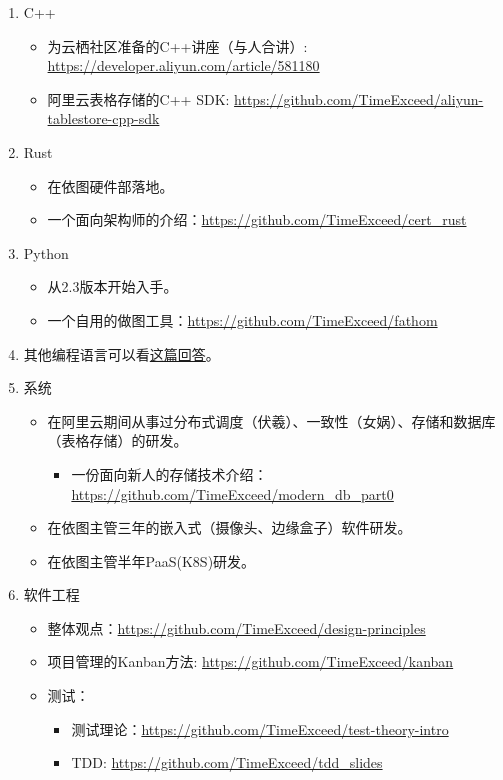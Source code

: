 \documentclass[scheme=plain]{ctexart}
\begin{document}
\begin{enumerate}
    \item C++
        \begin{itemize}
            \item 为云栖社区准备的C++讲座（与人合讲）: \url{https://developer.aliyun.com/article/581180}
            \item 阿里云表格存储的C++ SDK: \url{https://github.com/TimeExceed/aliyun-tablestore-cpp-sdk}
        \end{itemize}
    \item Rust
        \begin{itemize}
            \item 在依图硬件部落地。
            \item 一个面向架构师的介绍：\url{https://github.com/TimeExceed/cert_rust}
        \end{itemize}
    \item Python
        \begin{itemize}
            \item 从2.3版本开始入手。
            \item 一个自用的做图工具：\url{https://github.com/TimeExceed/fathom}
        \end{itemize}
    \item 其他编程语言可以看\href{https://www.zhihu.com/question/403828823/answer/1310069487}{这篇回答}。
    \item 系统
        \begin{itemize}
            \item 在阿里云期间从事过分布式调度（伏羲）、一致性（女娲）、存储和数据库（表格存储）的研发。
                \begin{itemize}
                    \item 一份面向新人的存储技术介绍：\url{https://github.com/TimeExceed/modern_db_part0}
                \end{itemize}
            \item 在依图主管三年的嵌入式（摄像头、边缘盒子）软件研发。
            \item 在依图主管半年PaaS(K8S)研发。
        \end{itemize}
    \item 软件工程
        \begin{itemize}
            \item 整体观点：\url{https://github.com/TimeExceed/design-principles}
            \item 项目管理的Kanban方法: \url{https://github.com/TimeExceed/kanban}
            \item 测试：
                \begin{itemize}
                    \item 测试理论：\url{https://github.com/TimeExceed/test-theory-intro}
                    \item TDD: \url{https://github.com/TimeExceed/tdd_slides}
                \end{itemize}
        \end{itemize}
\end{enumerate}
\end{document}
